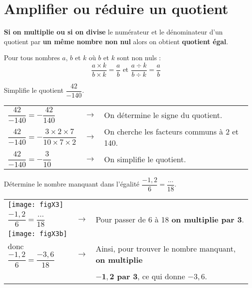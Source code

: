 \section{Amplifier ou réduire un quotient}

\begin{aconnaitre}
\textbf{Si on multiplie ou si on divise} le numérateur et le dénominateur d'un quotient par \textbf{un même nombre non nul} alors on obtient \textbf{quotient égal}.

Pour tous nombres $a$, $b$ et $k$ où $b$ et $k$ sont non nuls :
\[ \frac{a \times k}{b \times k} = \frac{a}{b} \text{ et } \frac{a \div k}{b \div k} = \frac{a}{b}\]
\end{aconnaitre}

\begin{exemple*1}
Simplifie le quotient $\dfrac{42}{-140}$.
\correction

\begin{tabular}{lll}
$\dfrac{42}{-140}=-\dfrac{42}{140}$ & $\longrightarrow$ & On détermine le signe du quotient. \\
$\dfrac{42}{-140}=-\dfrac{3 \times 2 \times 7}{10 \times 7 \times 2}$  & $\longrightarrow$ & On cherche les facteurs communs à 2 et 140. \\
$\dfrac{42}{-140}=-\dfrac{3}{10}$ & $\longrightarrow$ & On simplifie le quotient. \\
\end{tabular}
\end{exemple*1}

\begin{exemple*1}
Détermine le nombre manquant dans l'égalité $\dfrac{-1,2}{6}=\dfrac{...}{18}$.
\correction

\vspace{.5em}
\begin{tabular}{lll}
\hspace{1.5em}\texttt{[image: figX3]} & & \\
$\dfrac{-1,2}{6}=\dfrac{...}{18}$ & $\longrightarrow$ & Pour passer de 6 à 18 \textbf{on multiplie par 3}. \\
\hspace{1.5em}\texttt{[image: figX3b]} & & \\
donc $\dfrac{-1,2}{6}=\dfrac{-3,6}{18}$  & $\longrightarrow$ & Ainsi, pour trouver le nombre manquant, \textbf{on multiplie} \\
& & \textbf{$\mathbf{-1,2}$ par 3}, ce qui donne $-3,6$. \\
\end{tabular}
\end{exemple*1}


